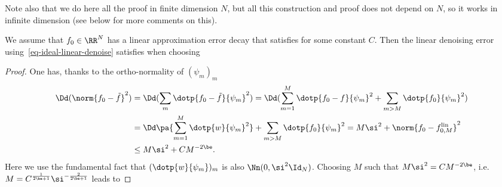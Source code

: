 Note also that we do here all the proof in finite dimension $N$, but all this construction and proof does not depend on $N$, so it works in infinite dimension (see below for more comments on this). 


\begin{thm}\label{thm-linear-denoising}
	We assume that $f_0 \in \RR^N$ has a linear approximation error decay that satisfies 
	for some constant $C$. Then the linear denoising error using~\eqref{eq-ideal-linear-denoise} satisfies
	when choosing 
\end{thm}

\begin{proof}
	One has, thanks to the ortho-normality of $(\psi_m)_m$
	\begin{align*}
		\Dd(\norm{f_0 - \tilde f}^2) &= 
		\Dd( \sum_m \dotp{f_0 - \tilde f}{\psi_m}^2 )
		= 
		\Dd( \sum_{m=1}^M \dotp{f_0 - f}{\psi_m}^2 + \sum_{m>M} \dotp{f_0 }{\psi_m}^2 ) \\
		&=
		\Dd\pa{\sum_{m=1}^M \dotp{w}{\psi_m}^2} + \sum_{m>M} \dotp{f_0}{\psi_m}^2
		= M \si^2 + \norm{f_0 - f_{0,M}^{\text{lin}}}^2 \\
		&\leq M \si^2 + C M^{-2\be}.
	\end{align*}
	Here we use the fundamental fact that $(\dotp{w}{\psi_m})_m$ is also $\Nn(0,\si^2\Id_N)$.
	Choosing $M$ such that $M \si^2 = C M^{-2\be}$, i.e. $M = C^{\frac{1}{2\be+1}} \si^{-\frac{2}{2\be+1}}$ leads 
	to 
\end{proof}

